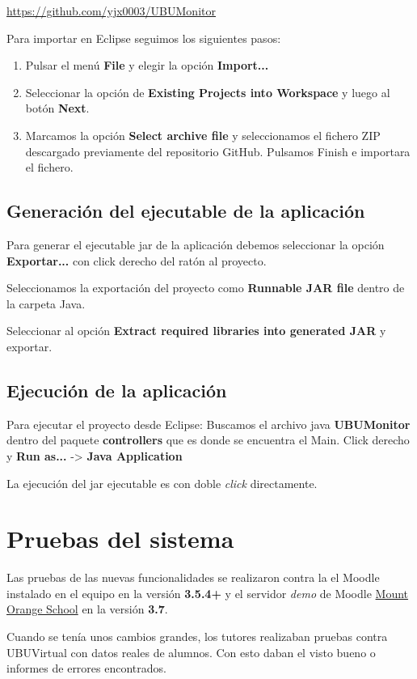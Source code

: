 \href{https://github.com/yjx0003/UBUMonitor}{https://github.com/yjx0003/UBUMonitor}

Para importar en Eclipse seguimos los siguientes pasos:

\begin{enumerate}
	\item Pulsar el menú \textbf{File} y elegir la opción \textbf{Import...}
	\item Seleccionar la opción de \textbf{Existing Projects into
		Workspace} y luego al botón \textbf{Next}.
	\item Marcamos la opción \textbf{Select archive file} y seleccionamos el fichero ZIP descargado previamente del repositorio GitHub. Pulsamos Finish e importara el fichero.
	
\end{enumerate}

\subsection{Generación del ejecutable de la aplicación}

Para generar el ejecutable jar de la aplicación debemos seleccionar la opción \textbf{Exportar...} con click derecho del ratón al proyecto.

Seleccionamos la exportación del proyecto como \textbf{Runnable JAR file} dentro de la carpeta Java.


Seleccionar al opción \textbf{Extract required libraries into generated JAR} y exportar.


\subsection{Ejecución de la aplicación}

Para ejecutar el proyecto desde Eclipse: Buscamos el archivo java \textbf{UBUMonitor} dentro del paquete \textbf{controllers} que es donde se encuentra el Main. Click derecho y \textbf{Run as...} -> \textbf{Java Application}


La ejecución del jar ejecutable es con doble \textit{click} directamente.
\section{Pruebas del sistema}

Las pruebas de las nuevas funcionalidades se realizaron contra la el Moodle instalado en el equipo en la versión \textbf{3.5.4+} y el servidor \textit{demo} de Moodle \href{https://school.demo.moodle.net}{Mount Orange School} en la versión \textbf{3.7}. 

Cuando se tenía unos cambios grandes, los tutores realizaban pruebas contra UBUVirtual con datos reales de alumnos. Con esto daban el visto bueno o informes de errores encontrados.